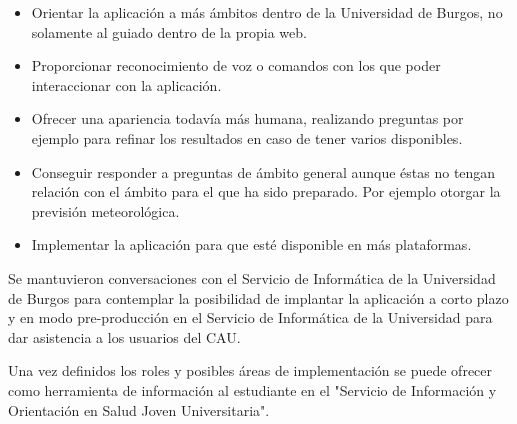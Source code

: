 \begin{itemize}
\tightlist
\item
Orientar la aplicación a más ámbitos dentro de la Universidad de Burgos, no solamente al guiado dentro de la propia web.
\item
Proporcionar reconocimiento de voz o comandos con los que poder interaccionar con la aplicación.
\item
Ofrecer una apariencia todavía más humana, realizando preguntas por ejemplo para refinar los resultados en caso de tener varios disponibles.
\item
Conseguir responder a preguntas de ámbito general aunque éstas no tengan relación con el ámbito para el que ha sido preparado. Por ejemplo otorgar la previsión meteorológica.
\item
Implementar la aplicación para que esté disponible en más plataformas.
\end{itemize}

Se mantuvieron conversaciones con el Servicio de Informática de la Universidad de Burgos para contemplar la posibilidad de implantar la aplicación a corto plazo y en modo pre-producción en el Servicio de Informática de la Universidad para dar asistencia a los usuarios del CAU.

Una vez definidos los roles y posibles áreas de implementación se puede ofrecer como herramienta de información al estudiante en el
"Servicio de Información y Orientación en Salud Joven Universitaria".